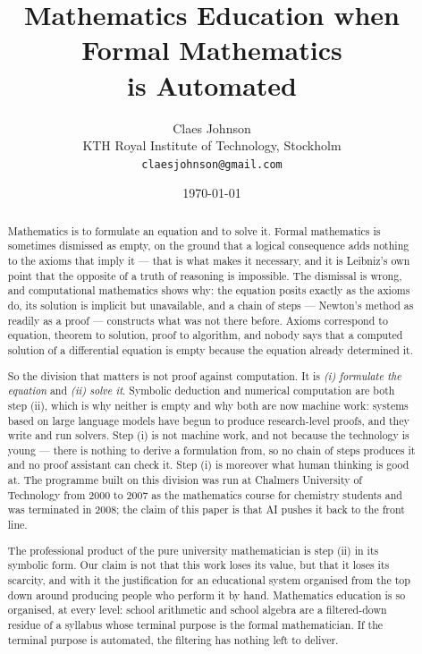 \documentclass[11pt]{article}
\title{\vspace{-2em}Mathematics Education when Formal Mathematics\\is Automated}
\author{Claes Johnson\\[0.3em]
\small KTH Royal Institute of Technology, Stockholm\\
\small \texttt{claesjohnson@gmail.com}}
\date{\today}
\begin{document}
\maketitle

\begin{abstract}
\noindent
Mathematics is to formulate an equation and to solve it. Formal mathematics is sometimes dismissed
as empty, on the ground that a logical consequence adds nothing to the axioms that imply it --- that
is what makes it necessary, and it is Leibniz's own point that the opposite of a truth of reasoning
is impossible. The dismissal is wrong, and computational mathematics shows why: the equation posits
exactly as the axioms do, its solution is implicit but unavailable, and a chain of steps ---
Newton's method as readily as a proof --- constructs what was not there before. Axioms correspond to
equation, theorem to solution, proof to algorithm, and nobody says that a computed solution of a
differential equation is empty because the equation already determined it.

So the division that matters is not proof against computation. It is \emph{(i) formulate the
equation} and \emph{(ii) solve it}. Symbolic deduction and numerical computation are both step (ii),
which is why neither is empty and why both are now machine work: systems based on large language
models have begun to produce research-level proofs, and they write and run solvers. Step (i) is not
machine work, and not because the technology is young --- there is nothing to derive a formulation
from, so no chain of steps produces it and no proof assistant can check it. Step (i) is moreover
what human thinking is good at. The programme built on this division was run at Chalmers University
of Technology from 2000 to 2007 as the mathematics course for chemistry students and was terminated
in 2008; the claim of this paper is that AI pushes it back to the front line.

The professional product of the pure university mathematician is step (ii) in its symbolic form. Our
claim is not that this work loses its value, but that it loses its scarcity, and with it the
justification for an educational system organised from the top down around producing people who
perform it by hand. Mathematics education is so organised, at every level: school arithmetic and
school algebra are a filtered-down residue of a syllabus whose terminal purpose is the formal
mathematician. If the terminal purpose is automated, the filtering has nothing left to deliver.


\end{abstract}
\end{document}
